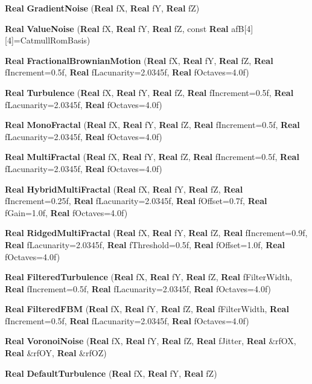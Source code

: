 \begin{CompactItemize}
{\bf Real} {\bf Gradient\-Noise} ({\bf Real} f\-X, {\bf Real} f\-Y, {\bf Real} f\-Z)
\item 
{\bf Real} {\bf Value\-Noise} ({\bf Real} f\-X, {\bf Real} f\-Y, {\bf Real} f\-Z, const {\bf Real} af\-B[4][4]=Catmull\-Rom\-Basis)
\item 
{\bf Real} {\bf Fractional\-Brownian\-Motion} ({\bf Real} f\-X, {\bf Real} f\-Y, {\bf Real} f\-Z, {\bf Real} f\-Increment=0.5f, {\bf Real} f\-Lacunarity=2.0345f, {\bf Real} f\-Octaves=4.0f)
\item 
{\bf Real} {\bf Turbulence} ({\bf Real} f\-X, {\bf Real} f\-Y, {\bf Real} f\-Z, {\bf Real} f\-Increment=0.5f, {\bf Real} f\-Lacunarity=2.0345f, {\bf Real} f\-Octaves=4.0f)
\item 
{\bf Real} {\bf Mono\-Fractal} ({\bf Real} f\-X, {\bf Real} f\-Y, {\bf Real} f\-Z, {\bf Real} f\-Increment=0.5f, {\bf Real} f\-Lacunarity=2.0345f, {\bf Real} f\-Octaves=4.0f)
\item 
{\bf Real} {\bf Multi\-Fractal} ({\bf Real} f\-X, {\bf Real} f\-Y, {\bf Real} f\-Z, {\bf Real} f\-Increment=0.5f, {\bf Real} f\-Lacunarity=2.0345f, {\bf Real} f\-Octaves=4.0f)
\item 
{\bf Real} {\bf Hybrid\-Multi\-Fractal} ({\bf Real} f\-X, {\bf Real} f\-Y, {\bf Real} f\-Z, {\bf Real} f\-Increment=0.25f, {\bf Real} f\-Lacunarity=2.0345f, {\bf Real} f\-Offset=0.7f, {\bf Real} f\-Gain=1.0f, {\bf Real} f\-Octaves=4.0f)
\item 
{\bf Real} {\bf Ridged\-Multi\-Fractal} ({\bf Real} f\-X, {\bf Real} f\-Y, {\bf Real} f\-Z, {\bf Real} f\-Increment=0.9f, {\bf Real} f\-Lacunarity=2.0345f, {\bf Real} f\-Threshold=0.5f, {\bf Real} f\-Offset=1.0f, {\bf Real} f\-Octaves=4.0f)
\item 
{\bf Real} {\bf Filtered\-Turbulence} ({\bf Real} f\-X, {\bf Real} f\-Y, {\bf Real} f\-Z, {\bf Real} f\-Filter\-Width, {\bf Real} f\-Increment=0.5f, {\bf Real} f\-Lacunarity=2.0345f, {\bf Real} f\-Octaves=4.0f)
\item 
{\bf Real} {\bf Filtered\-FBM} ({\bf Real} f\-X, {\bf Real} f\-Y, {\bf Real} f\-Z, {\bf Real} f\-Filter\-Width, {\bf Real} f\-Increment=0.5f, {\bf Real} f\-Lacunarity=2.0345f, {\bf Real} f\-Octaves=4.0f)
\item 
{\bf Real} {\bf Voronoi\-Noise} ({\bf Real} f\-X, {\bf Real} f\-Y, {\bf Real} f\-Z, {\bf Real} f\-Jitter, {\bf Real} \&rf\-OX, {\bf Real} \&rf\-OY, {\bf Real} \&rf\-OZ)
\item 
{\bf Real} {\bf Default\-Turbulence} ({\bf Real} f\-X, {\bf Real} f\-Y, {\bf Real} f\-Z)
\item 

\end{CompactItemize}
